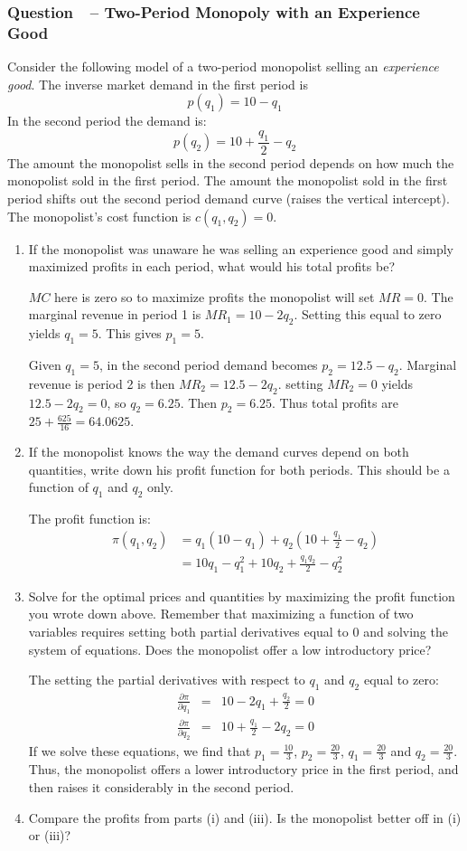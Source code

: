 \documentclass[12pt]{article}
\newcounter{question}[section]
\newcommand{\question}[1]{\refstepcounter{question}
  \subsubsection*{Question~\thequestion~-- #1}}
\newenvironment{subquestions}{
  \begin{enumerate}[label=(\roman*)]}{\end{enumerate}}
\begin{document}
\question{Two-Period Monopoly with an Experience Good}
Consider the following model of a two-period monopolist selling an
\emph{experience good}. The inverse market demand in the first period is
\[
  p\left( q_1 \right) =10-q_1
\]
In the second period the demand is:
\[
  p\left( q_2 \right) = 10+\frac{q_1}{2}-q_2
\]
The amount the monopolist sells in the second period depends on how much the
monopolist sold in the first period. The amount the monopolist sold in the
first period shifts out the second period demand curve (raises the vertical
intercept). The monopolist's cost function is $c\left( q_1,q_2 \right)=0$.
\begin{subquestions}
  \item If the monopolist was unaware he was selling an experience good and
    simply maximized profits in each period, what would his total profits be?

  \textcolor{solution-color}{
    $MC$ here is zero so to maximize profits the monopolist will set $MR=0$.
    The marginal revenue in period 1 is $MR_1=10-2q_2$. Setting this equal to zero
  yields $q_1=5$. This gives $p_1 =5$.}

  \textcolor{solution-color}{
  Given $q_1=5$, in the second period demand becomes $p_2 = 12.5-q_2$. Marginal
  revenue is period 2 is then $MR_2=12.5-2q_2$.  setting $MR_2=0$ yields
  $12.5-2q_2=0$, so $q_2 = 6.25$. Then $p_2=6.25$. Thus total profits are $25+
  \frac{625}{16} = 64.0625$.
}
  \item If the monopolist knows the way the demand curves depend on both
    quantities, write down his profit function for both periods. This should be
    a function of $q_1$ and $q_2$ only.

  \textcolor{solution-color}{
    The profit function is:
    \begin{align*}
      \pi\left( q_1,q_2 \right) &= q_1(10-q_1) + q_2(10+\frac{q_1}{2}-q_2) \\
      &= 10q_1 - q_1^2 + 10q_2 + \frac{q_1q_2}{2} - q_2^2
    \end{align*}
  }
  \item Solve for the optimal prices and quantities by maximizing the profit
    function you wrote down above. Remember that maximizing a function of two
    variables requires setting both partial derivatives equal to 0 and solving
    the system of equations. Does the monopolist offer a low introductory
    price?

  \textcolor{solution-color}{
The setting the partial derivatives with respect to $q_1$ and $q_2$ equal to
zero:
\begin{eqnarray*}
  \frac{\partial \pi}{\partial q_1} &=&10 -2q_1 +\frac{q_2}{2} =0 \\
  \frac{\partial \pi}{\partial q_2} &=&10+\frac{q_1}{2} -2q_2 =0
\end{eqnarray*}
If we solve these equations, we find that $p_1 = \frac{10}{3}$, $p_2 =
\frac{20}{3}$, $q_1 = \frac{20}{3}$ and $q_2 =\frac{20}{3}$. Thus, the
monopolist offers a lower introductory price in the first period, and then
raises it considerably in the second period.
  }
  \item Compare the profits from parts (i) and (iii). Is the monopolist better
    off in (i) or (iii)?


\end{subquestions}
\end{document}

